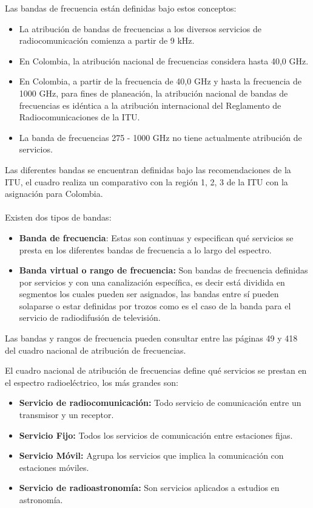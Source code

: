 Las bandas de frecuencia están definidas bajo estos conceptos:

\begin{itemize}
	\item La atribución de bandas de frecuencias a los diversos servicios de radiocomunicación comienza a partir de 9 kHz.
	\item En Colombia, la atribución nacional de frecuencias considera hasta 40,0 GHz.
	\item En Colombia, a partir de la frecuencia de 40,0 GHz y hasta la frecuencia de 1000 GHz, para fines de planeación, la atribución nacional de bandas de frecuencias es idéntica a la atribución internacional del Reglamento de Radiocomunicaciones de la ITU.
	\item La banda de frecuencias 275 - 1000 GHz no tiene actualmente atribución de servicios.
\end{itemize}

Las diferentes bandas se encuentran definidas bajo las recomendaciones de la ITU, el cuadro realiza un comparativo con la región 1, 2, 3 de la ITU con la asignación para Colombia.
\\\\
Existen dos tipos de bandas:
\begin{itemize}
	\item \textbf{Banda de frecuencia}: Estas son continuas y especifican qué servicios se presta en los diferentes bandas de frecuencia a lo largo del espectro.
	\item \textbf{Banda virtual o rango de frecuencia:} Son bandas de frecuencia definidas por servicios y con una canalización específica, es decir está dividida en segmentos los cuales pueden ser asignados, las bandas entre sí pueden solaparse o estar definidas por trozos como es el caso de la banda para el servicio de radiodifusión de televisión.
\end{itemize}

Las bandas y rangos de frecuencia pueden consultar entre las páginas 49 y 418 del cuadro nacional de atribución de frecuencias.

El cuadro nacional de atribución de frecuencias define qué servicios se prestan en el espectro radioeléctrico, los más grandes son:

\begin{itemize}
	\item \textbf{Servicio de radiocomunicación:} Todo servicio de comunicación entre un transmisor y un receptor.
	\item \textbf{Servicio Fijo:} Todos los servicios de comunicación entre estaciones fijas.
	\item \textbf{Servicio Móvil:} Agrupa los servicios que implica la comunicación con estaciones móviles.
	\item \textbf{Servicio de radioastronomía:} Son servicios aplicados a estudios en astronomía.
\end{itemize}

